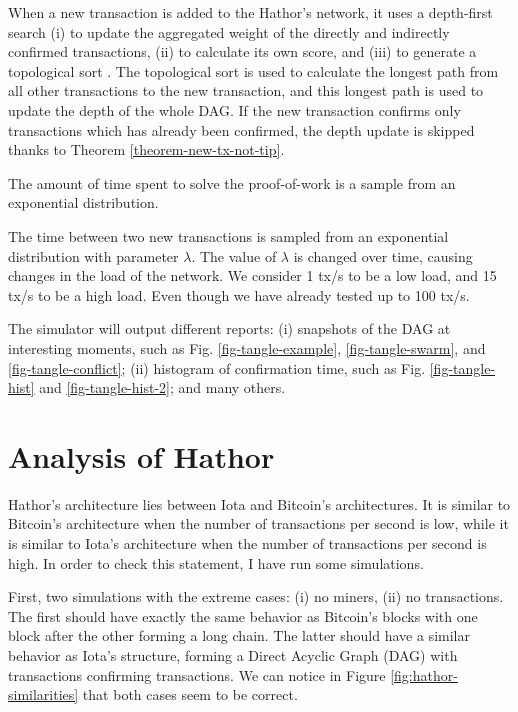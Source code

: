 When a new transaction is added to the Hathor's network, it uses a depth-first search \citep{cormen2009introduction} (i) to update the aggregated weight of the directly and indirectly confirmed transactions, (ii) to calculate its own score, and (iii) to generate a topological sort \citep{cormen2009introduction}. The topological sort is used to calculate the longest path from all other transactions to the new transaction, and this longest path is used to update the depth of the whole DAG. If the new transaction confirms only transactions which has already been confirmed, the depth update is skipped thanks to Theorem \ref{theorem-new-tx-not-tip}.

The amount of time spent to solve the proof-of-work is a sample from an exponential distribution.

The time between two new transactions is sampled from an exponential distribution with parameter $\lambda$. The value of $\lambda$ is changed over time, causing changes in the load of the network. We consider 1 tx/s to be a low load, and 15 tx/s to be a high load. Even though we have already tested up to 100 tx/s.

The simulator will output different reports: (i) snapshots of the DAG at interesting moments, such as Fig. \ref{fig-tangle-example}, \ref{fig-tangle-swarm}, and \ref{fig-tangle-conflict}; (ii) histogram of confirmation time, such as Fig. \ref{fig-tangle-hist} and \ref{fig-tangle-hist-2}; and many others.


\chapter{Analysis of Hathor}

Hathor's architecture lies between Iota and Bitcoin's architectures. It is similar to Bitcoin's architecture when the number of transactions per second is low, while it is similar to Iota's architecture when the number of transactions per second is high. In order to check this statement, I have run some simulations.

First, two simulations with the extreme cases: (i) no miners, (ii) no transactions. The first should have exactly the same behavior as Bitcoin's blocks with one block after the other forming a long chain. The latter should have a similar behavior as Iota's structure, forming a Direct Acyclic Graph (DAG) with transactions confirming transactions. We can notice in Figure \ref{fig:hathor-similarities} that both cases seem to be correct.

